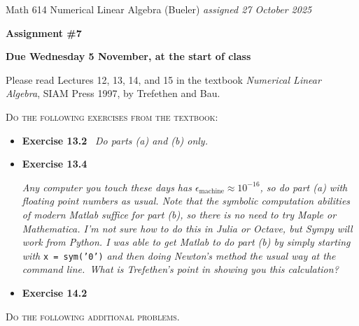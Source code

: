 \documentclass[12pt,dvipsnames]{amsart}
\newcommand{\eps}{\epsilon}
\begin{document}
\scriptsize \noindent Math 614 Numerical Linear Algebra (Bueler) \hfill \emph{assigned 27 October 2025}
\normalsize\medskip

\Large\centerline{\textbf{Assignment \#7}}
\large
\medskip

\centerline{\textbf{Due Wednesday 5 November, at the start of class}}
\medskip
\normalsize

\thispagestyle{empty}

\bigskip

\noindent Please read Lectures 12, 13, 14, and 15 in the textbook \emph{Numerical Linear Algebra}, SIAM Press 1997, by Trefethen and Bau.

\bigskip
\noindent \textsc{Do the following exercises from the textbook}:

\begin{itemize}[itemsep=4pt]
\item \textbf{Exercise 13.2}  \quad\, \emph{Do parts \emph{(a)} and \emph{(b)} only.}
\item \textbf{Exercise 13.4}  \quad\, \begin{minipage}[t]{0.68\textwidth}   \emph{Any computer you touch these days has $\eps_{\text{machine}}\approx 10^{-16}$, so do part (a) with floating point numbers as usual.  Note that the symbolic computation abilities of modern Matlab suffice for part (b), so there is no need to try Maple or Mathematica.  I'm not sure how to do this in Julia or Octave, but Sympy will work from Python.  I was able to get Matlab to do part (b) by simply starting with} {\small \texttt{x = sym('0')}} \emph{and then doing Newton's method the usual way at the command line.\footnotemark \, What is Trefethen's point in showing you this calculation?}\end{minipage}
\item \textbf{Exercise 14.2}
\end{itemize}


\medskip
\noindent \textsc{Do the following additional problems.}
\end{document}
